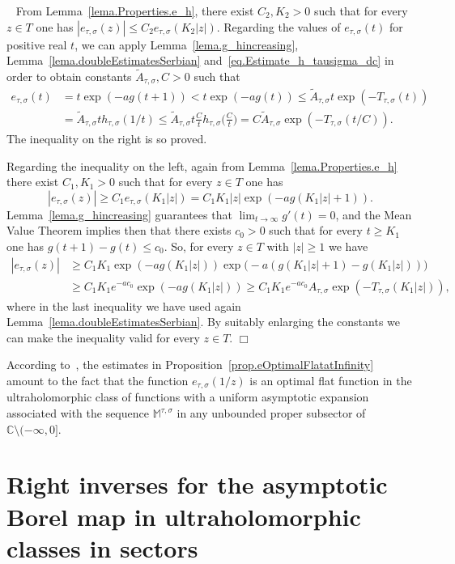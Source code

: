 \documentclass[12pt,leqno]{amsart}
\def\C{\mathbb{C}}
\theoremstyle{plain}
\theoremstyle{definition}
\numberwithin{equation}{section}
\def\M{\mathbb{M}}
\newenvironment{proof1}{\medskip\par\noindent{\bf Proof}\ \normalfont}{\hfill $\Box$
\medskip\par}
\begin{document}
\begin{proof1}
From Lemma~\ref{lema.Properties.e_h}, there exist $C_2,K_2>0$ such that for every $z\in T$ one has $|e_{\tau,\sigma}(z)|\le C_2e_{\tau,\sigma}(K_2|z|)$. Regarding the values of $e_{\tau,\sigma}(t)$ for positive real $t$, we can apply Lemma~\ref{lema.g_hincreasing}, Lemma~\ref{lema.doubleEstimatesSerbian} and~\eqref{eq.Estimate_h_tausigma_dc} in order to obtain
constants $\tilde{A}_{\tau,\sigma},C>0$ such that
\begin{align*}
e_{\tau,\sigma}(t)&=t\exp(-ag(t+1))<t\exp(-ag(t))\le \tilde{A}_{\tau,\sigma}t\exp(-T_{\tau,\sigma}(t))\\
&=\tilde{A}_{\tau,\sigma}th_{\tau,\sigma}(1/t)\le
\tilde{A}_{\tau,\sigma}t\frac{C}{t}h_{\tau,\sigma}\big(\frac{C}{t}\big)=
C\tilde{A}_{\tau,\sigma}\exp(-T_{\tau,\sigma}(t/C)).
\end{align*}
The inequality on the right is so proved.

Regarding the inequality on the left, again from Lemma~\ref{lema.Properties.e_h} there exist $C_1,K_1>0$ such that for every $z\in T$ one has
$$
|e_{\tau,\sigma}(z)|\ge C_1e_{\tau,\sigma}(K_1|z|)=C_1K_1|z|\exp(-ag(K_1|z|+1)).
$$
Lemma~\ref{lema.g_hincreasing} guarantees that $\lim_{t\to\infty}g'(t)=0$, and the Mean Value Theorem implies then that there exists $c_0>0$ such that for every $t\ge K_1$ one has $g(t+1)-g(t)\le c_0$. So, for every $z\in T$ with $|z|\ge 1$ we have
\begin{align*}
|e_{\tau,\sigma}(z)|&\ge C_1K_1\exp(-ag(K_1|z|))\exp\big(-a(g(K_1|z|+1)-g(K_1|z|))\big)\\
&\ge C_1K_1e^{-ac_0}\exp(-ag(K_1|z|))\ge
C_1K_1e^{-ac_0}A_{\tau,\sigma}\exp(-T_{\tau,\sigma}(K_1|z|)),
\end{align*}
where in the last inequality we have used again Lemma~\ref{lema.doubleEstimatesSerbian}. By suitably enlarging the constants we can make the inequality valid for every $z\in T$.
\end{proof1}

According to~\cite[Theorem~2.3.1]{Thilliez03}, the estimates in Proposition~\ref{prop.eOptimalFlatatInfinity} amount to the fact that the function $e_{\tau,\sigma}(1/z)$ is an optimal flat function in the ultraholomorphic class of functions with a uniform asymptotic expansion associated with the sequence $\M^{\tau,\sigma}$ in any unbounded proper subsector of $\C\setminus(-\infty,0]$.


\section{Right inverses for the asymptotic Borel map in ultraholomorphic classes in sectors}\label{sectRightInver1var}
\end{document}
